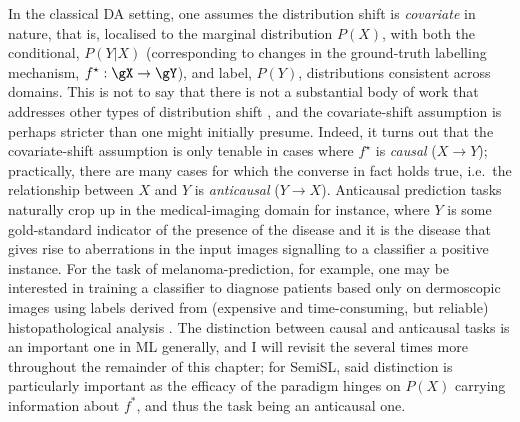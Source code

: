 %
In the classical \ac{DA} setting, one assumes the distribution shift is \emph{covariate}
\citep{david2010impossibility} in nature, that is, localised to the marginal distribution \(P(X)\),
with both the conditional, \(P(Y|X)\) (corresponding to changes in the ground-truth labelling
mechanism, \( f^\star: \gX \to \gY \)), and label, \(P(Y)\), distributions consistent across
domains.
%
This is not to say that there is not a substantial body of work that addresses other types of
distribution shift \citep{zhao2019learning}, and the covariate-shift assumption is perhaps stricter
than one might initially presume.
%
Indeed, it turns out that the covariate-shift assumption is only tenable in cases where \(f^\star\)
is \emph{causal} (\(X \to Y\)); practically, there are many cases for which the converse in fact
holds true, i.e.\ the relationship between \(X\) and \(Y\) is \emph{anticausal} (\(Y \to X\)).
%
Anticausal prediction tasks naturally crop up in the medical-imaging domain for instance, where
\(Y\) is some gold-standard indicator of the presence of the disease and it is the disease that
gives rise to aberrations in the input images signalling to a classifier a positive instance. 
%
For the task of melanoma-prediction, for example, one may be interested in training a classifier to
diagnose patients based only on dermoscopic images using labels derived from (expensive and
time-consuming, but reliable) histopathological analysis \citep{castro2020causality}.
%
The distinction between causal and anticausal tasks is an important one in \ac{ML} generally, and I
will revisit the several times more throughout the remainder of this chapter; for \ac{SemiSL}, said
distinction is particularly important as the efficacy of the paradigm hinges on \( P(X) \) carrying
information about \(f^\ast\), and thus the task being an anticausal one.
%
%
